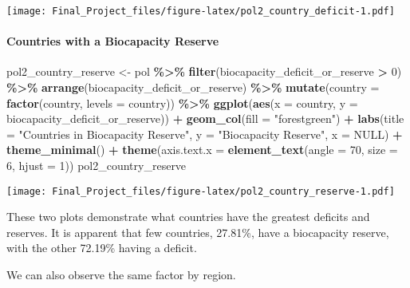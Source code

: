 \documentclass[
]{article}
\newenvironment{Shaded}{\begin{snugshade}}{\end{snugshade}}
\newcommand{\AttributeTok}[1]{\textcolor[rgb]{0.13,0.29,0.53}{#1}}
\newcommand{\ConstantTok}[1]{\textcolor[rgb]{0.56,0.35,0.01}{#1}}
\newcommand{\DecValTok}[1]{\textcolor[rgb]{0.00,0.00,0.81}{#1}}
\newcommand{\FunctionTok}[1]{\textcolor[rgb]{0.13,0.29,0.53}{\textbf{#1}}}
\newcommand{\NormalTok}[1]{#1}
\newcommand{\OtherTok}[1]{\textcolor[rgb]{0.56,0.35,0.01}{#1}}
\newcommand{\SpecialCharTok}[1]{\textcolor[rgb]{0.81,0.36,0.00}{\textbf{#1}}}
\newcommand{\StringTok}[1]{\textcolor[rgb]{0.31,0.60,0.02}{#1}}
\begin{document}
\texttt{[image: Final\_Project\_files/figure-latex/pol2\_country\_deficit-1.pdf]}

\paragraph{Countries with a Biocapacity
Reserve}\label{countries-with-a-biocapacity-reserve}

\begin{Shaded}
\begin{Highlighting}[]
\NormalTok{pol2\_country\_reserve }\OtherTok{\textless{}{-}}\NormalTok{ pol }\SpecialCharTok{\%\textgreater{}\%}
  \FunctionTok{filter}\NormalTok{(biocapacity\_deficit\_or\_reserve }\SpecialCharTok{\textgreater{}} \DecValTok{0}\NormalTok{) }\SpecialCharTok{\%\textgreater{}\%}
  \FunctionTok{arrange}\NormalTok{(biocapacity\_deficit\_or\_reserve) }\SpecialCharTok{\%\textgreater{}\%}
  \FunctionTok{mutate}\NormalTok{(}\AttributeTok{country =} \FunctionTok{factor}\NormalTok{(country, }\AttributeTok{levels =}\NormalTok{ country)) }\SpecialCharTok{\%\textgreater{}\%}
  \FunctionTok{ggplot}\NormalTok{(}\FunctionTok{aes}\NormalTok{(}\AttributeTok{x =}\NormalTok{ country, }\AttributeTok{y =}\NormalTok{ biocapacity\_deficit\_or\_reserve)) }\SpecialCharTok{+}
  \FunctionTok{geom\_col}\NormalTok{(}\AttributeTok{fill =} \StringTok{"forestgreen"}\NormalTok{) }\SpecialCharTok{+}
  \FunctionTok{labs}\NormalTok{(}\AttributeTok{title =} \StringTok{"Countries in Biocapacity Reserve"}\NormalTok{,}
       \AttributeTok{y =} \StringTok{"Biocapacity Reserve"}\NormalTok{,}
       \AttributeTok{x =} \ConstantTok{NULL}\NormalTok{) }\SpecialCharTok{+}
  \FunctionTok{theme\_minimal}\NormalTok{() }\SpecialCharTok{+}
  \FunctionTok{theme}\NormalTok{(}\AttributeTok{axis.text.x =} \FunctionTok{element\_text}\NormalTok{(}\AttributeTok{angle =} \DecValTok{70}\NormalTok{, }\AttributeTok{size =} \DecValTok{6}\NormalTok{, }\AttributeTok{hjust =} \DecValTok{1}\NormalTok{))}
\NormalTok{pol2\_country\_reserve}
\end{Highlighting}
\end{Shaded}

\texttt{[image: Final\_Project\_files/figure-latex/pol2\_country\_reserve-1.pdf]}

These two plots demonstrate what countries have the greatest deficits
and reserves. It is apparent that few countries, 27.81\%, have a
biocapacity reserve, with the other 72.19\% having a deficit.

We can also observe the same factor by region.
\end{document}
